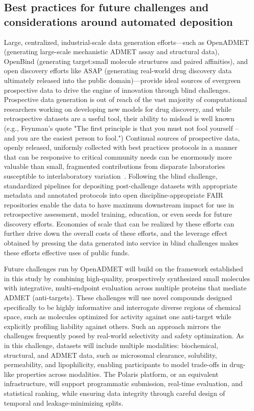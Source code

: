 \documentclass[journal=jcim,manuscript=article]{achemso}
\begin{document}
\subsection{Best practices for future challenges and considerations around automated deposition}

Large, centralized, industrial-scale data generation efforts---such as OpenADMET (generating large-scale mechanistic ADMET assay and structural data), OpenBind (generating target:small molecule structures and paired affinities), and open discovery efforts like ASAP (generating real-world drug discovery data ultimately released into the public domain)---provide ideal sources of evergreen prospective data to drive the engine of innovation through blind challenges.
Prospective data generation is out of reach of the vast majority of computational researchers working on developing new models for drug discovery, and while retrospective datasets are a useful tool, their ability to mislead is well known (e.g., Feynman's quote "The first principle is that you must not fool yourself -- and you are the easiest person to fool.")
Continual sources of prospective data, openly released, uniformly collected with best practices protocols in a manner that can be responsive to critical community needs can be enormously more valuable than small, fragmented contributions from disparate laboratories susceptible to interlaboratory variation~\cite{kramer2012experimental,kalliokoski2013comparability,landrum_combining_2024}.
Following the blind challenge, standardized pipelines for depositing post-challenge datasets with appropriate metadata and annotated protocols into open discipline-appropriate FAIR repositories enable the data to have maximum downstream impact for use in retrospective assessment, model training, education, or even seeds for future discovery efforts. 
Economies of scale that can be realized by these efforts can further drive down the overall costs of these efforts, and the leverage effect obtained by pressing the data generated into service in blind challenges makes these efforts effective uses of public funds.

Future challenges run by OpenADMET will build on the framework established in this study by combining high-quality, prospectively synthesized small molecules with integrative, multi-endpoint evaluation across multiple proteins that mediate ADMET (anti-targets). 
These challenges will use novel compounds designed specifically to be highly informative and interrogate diverse regions of chemical space, such as molecules optimized for activity against one anti-target while explicitly profiling liability against others. 
Such an approach mirrors the challenges frequently posed by real-world selectivity and safety optimization. 
As in this challenge, datasets will include multiple modalities: biochemical, structural, and ADMET data, such as microsomal clearance, solubility, permeability, and lipophilicity, enabling participants to model trade-offs in drug-like properties across modalities. 
The Polaris platform, or an equivalent infrastructure, will support programmatic submission, real-time evaluation, and statistical ranking, while ensuring data integrity through careful design of temporal and leakage-minimizing splits.
\end{document}
